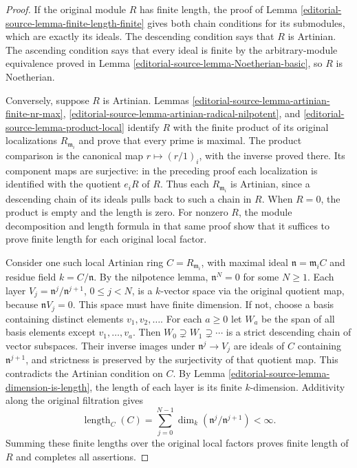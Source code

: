 \begin{proof}
If the original module $R$ has finite length, the proof of
Lemma \ref{editorial-source-lemma-finite-length-finite} gives both chain conditions
for its submodules, which are exactly its ideals. The descending
condition says that $R$ is Artinian. The ascending condition says
that every ideal is finite by the arbitrary-module equivalence
proved in Lemma \ref{editorial-source-lemma-Noetherian-basic}, so $R$ is Noetherian.

Conversely, suppose $R$ is Artinian. Lemmas
\ref{editorial-source-lemma-artinian-finite-nr-max},
\ref{editorial-source-lemma-artinian-radical-nilpotent}, and
\ref{editorial-source-lemma-product-local} identify $R$ with the finite product
of its original localizations $R_{\mathfrak m_i}$ and prove
that every prime is maximal. The product comparison is the
canonical map $r\mapsto(r/1)_i$, with the inverse proved there.
Its component maps are surjective: in the preceding proof each
localization is identified with the quotient $e_iR$ of $R$.
Thus each $R_{\mathfrak m_i}$ is Artinian, since a descending
chain of its ideals pulls back to such a chain in $R$.
When $R=0$, the product is empty and the length is zero.
For nonzero $R$, the module decomposition and length formula
in that same proof show that it suffices to prove finite length
for each original local factor.

Consider one such local Artinian ring $C=R_{\mathfrak m_i}$,
with maximal ideal $\mathfrak n=\mathfrak m_i C$ and residue
field $k=C/\mathfrak n$. By the nilpotence lemma,
$\mathfrak n^N=0$ for some $N\geq1$.
Each layer $V_j=\mathfrak n^j/\mathfrak n^{j+1}$,
$0\leq j<N$, is a $k$-vector space via the original quotient
map, because $\mathfrak n V_j=0$.
This space must have finite dimension. If not, choose a basis
containing distinct elements $v_1,v_2,\ldots$.
For each $a\geq0$ let $W_a$ be the span of all basis elements
except $v_1,\ldots,v_a$. Then
$W_0\supsetneq W_1\supsetneq\cdots$ is a strict descending
chain of vector subspaces. Their inverse images under
$\mathfrak n^j\to V_j$ are ideals of $C$ containing
$\mathfrak n^{j+1}$, and strictness is preserved by the
surjectivity of that quotient map. This contradicts the
Artinian condition on $C$.
By Lemma \ref{editorial-source-lemma-dimension-is-length}, the length of each
layer is its finite $k$-dimension. Additivity along the original
filtration gives
$$
\operatorname{length}_C(C)
=\sum_{j=0}^{N-1}\dim_k(\mathfrak n^j/\mathfrak n^{j+1})<\infty.
$$
Summing these finite lengths over the original local factors
proves finite length of $R$ and completes all assertions.


\end{proof}

